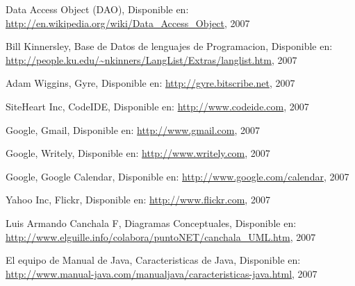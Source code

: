\begin{thebibliography}{99}
 Data Access Object (DAO), Disponible en:
	\url{http://en.wikipedia.org/wiki/Data_Access_Object}, 2007

 Bill Kinnersley, Base de Datos de lenguajes de Programacion, Disponible en:
	\url{http://people.ku.edu/~nkinners/LangList/Extras/langlist.htm}, 2007

 Adam Wiggins, Gyre, Disponible en:
	\url{http://gyre.bitscribe.net}, 2007

 SiteHeart Inc, CodeIDE, Disponible en:
	\url{http://www.codeide.com}, 2007

 Google, Gmail, Disponible en:
	\url{http://www.gmail.com}, 2007

 Google, Writely, Disponible en:
	\url{http://www.writely.com}, 2007

 Google, Google Calendar, Disponible en:
	\url{http://www.google.com/calendar}, 2007

 Yahoo Inc, Flickr, Disponible en:
	\url{http://www.flickr.com}, 2007

 Luis Armando Canchala F, Diagramas Conceptuales, Disponible en:
	\url{http://www.elguille.info/colabora/puntoNET/canchala_UML.htm}, 2007


 El equipo de Manual de Java, Caracteristicas de Java, Disponible en:
	\url{http://www.manual-java.com/manualjava/caracteristicas-java.html}, 2007

\end{thebibliography}
